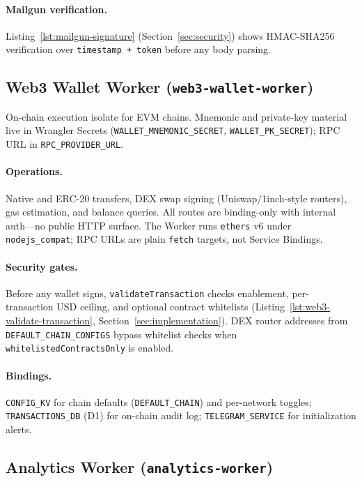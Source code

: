 \paragraph{Mailgun verification.} Listing~\ref{lst:mailgun-signature} (Section~\ref{sec:security}) shows HMAC-SHA256 verification over \texttt{timestamp + token} before any body parsing.

\subsection{Web3 Wallet Worker (\texttt{web3-wallet-worker})}

On-chain execution isolate for EVM chains. Mnemonic and private-key material live in Wrangler Secrets (\texttt{WALLET\_MNEMONIC\_SECRET}, \texttt{WALLET\_PK\_SECRET}); RPC URL in \texttt{RPC\_PROVIDER\_URL}.

\paragraph{Operations.} Native and ERC-20 transfers, DEX swap signing (Uniswap/1inch-style routers), gas estimation, and balance queries. All routes are binding-only with internal auth---no public HTTP surface. The Worker runs \texttt{ethers} v6 under \texttt{nodejs\_compat}; RPC URLs are plain \texttt{fetch} targets, not Service Bindings.

\paragraph{Security gates.} Before any wallet signs, \texttt{validateTransaction} checks enablement, per-transaction USD ceiling, and optional contract whitelists (Listing~\ref{lst:web3-validate-transaction}, Section~\ref{sec:implementation}). DEX router addresses from \texttt{DEFAULT\_CHAIN\_CONFIGS} bypass whitelist checks when \texttt{whitelistedContractsOnly} is enabled.

\paragraph{Bindings.} \texttt{CONFIG\_KV} for chain defaults (\texttt{DEFAULT\_CHAIN}) and per-network toggles; \texttt{TRANSACTIONS\_DB} (D1) for on-chain audit log; \texttt{TELEGRAM\_SERVICE} for initialization alerts.

\subsection{Analytics Worker (\texttt{analytics-worker})}

